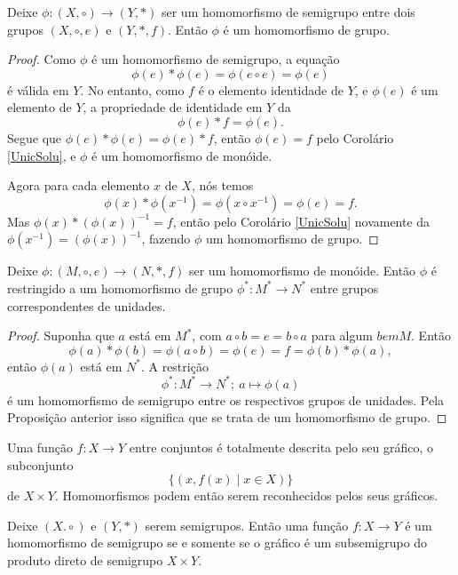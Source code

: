 \begin{stat}
  Deixe $\phi: (X,\circ) \to (Y,*)$ ser um homomorfismo de semigrupo entre dois grupos $(X,\circ,e)$ e $(Y,*,f)$. Então $\phi$ é um homomorfismo de grupo.
  \begin{proof}
    Como $\phi$ é um homomorfismo de semigrupo, a equação
    $$\phi(e)*\phi(e) = \phi(e\circ e)=\phi(e)$$
    é válida em $Y$. No entanto, como $f$ é o elemento identidade de $Y$, e $\phi(e)$ é um elemento de $Y$, a propriedade de identidade em $Y$ da $$\phi(e)*f=\phi(e).$$
    Segue que $\phi(e)*\phi(e)=\phi(e)*f$, então $\phi(e) =f$ pelo Corolário \ref{UnicSolu}, e $\phi$ é um homomorfismo de monóide.

    Agora para cada elemento $x$ de $X$, nós temos $$\phi(x)*\phi(x^{-1})=\phi(x\circ x^{-1}) = \phi(e)=f.$$
    Mas $\phi(x)*(\phi(x))^{-1} = f$, então pelo Corolário \ref{UnicSolu} novamente da $\phi(x^{-1})=(\phi(x))^{-1}$, fazendo $\phi$ um homomorfismo de grupo.
  \end{proof}
\end{stat}

\begin{theorem}
  Deixe $\phi:(M,\circ,e)\to (N,*,f)$ ser um homomorfismo de monóide. Então $\phi$ é restringido a um homomorfismo de grupo $\phi^{*}:M^* \to N^*$ entre grupos correspondentes de unidades.
  \begin{proof}
    Suponha que $a$ está em $M^*$, com $a\circ b = e = b\circ a$ para algum $b em M$. Então
    $$\phi(a)* \phi (b) = \phi(a \circ b) = \phi(e) = f = \phi(b) * \phi(a),$$
    então $\phi(a)$ está em $N^*$. A restrição $$\phi^{*}:M^{*}\to N^{*};\ a\mapsto \phi(a)$$
    é um homomorfismo de semigrupo entre os respectivos grupos de unidades. Pela Proposição anterior isso significa que se trata de um homomorfismo de grupo.
  \end{proof}
\end{theorem}



Uma função $f:X\to Y$ entre conjuntos é totalmente descrita pelo seu gráfico, o subconjunto
$$\{(x,f(x)\mid x \in X)\}$$ de $X\times Y$. Homomorfismos podem então serem reconhecidos pelos seus gráficos.

\begin{stat}
  Deixe $(X.\circ)$ e $(Y,*)$ serem semigrupos. Então uma função $f: X\to Y$ é um homomorfismo de semigrupo se e somente se o gráfico é um subsemigrupo do produto direto de semigrupo $X\times Y$.
\end{stat}

